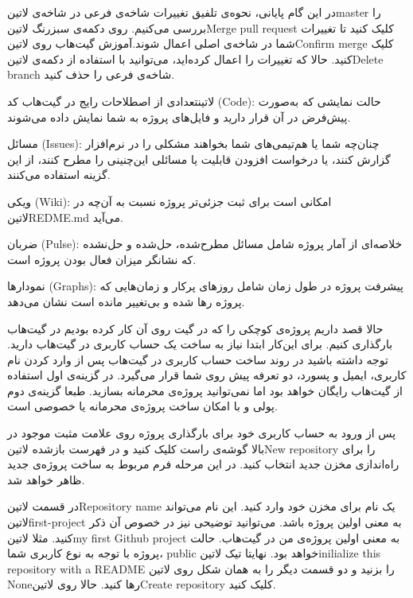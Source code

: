 در این گام پایانی، نحوه‌ی تلفیق تغییرات شاخه‌ی فرعی در شاخه‌ی ‌لاتین{master} را بررسی می‌کنیم.
روی دکمه‌ی سبزرنگ ‌لاتین{Merge pull request} کلیک کنید تا تغییرات شما در شاخه‌ی اصلی اعمال شوند.آموزش گیت‌هاب
روی ‌لاتین{Confirm merge} کلیک کنید.
حالا که تغییرات را اعمال کرده‌اید، می‌توانید با استفاده از دکمه‌ی ‌لاتین{Delete branch} شاخه‌ی فرعی را حذف کنید.


‌لاتین{تعدادی از اصطلاحات رایج در گیت‌هاب}
کد (Code): حالت نمایشی که به‌صورت پیش‌فرض در آن قرار دارید و فایل‌های پروژه به شما نمایش داده می‌شوند.

\noindent
مسائل (Issues): چنان‌چه شما یا هم‌تیمی‌های شما بخواهند مشکلی را در نرم‌افزار گزارش کنند، یا درخواست افزودن قابلیت یا مسائلی این‌چنینی را مطرح کنند، از این گزینه استفاده می‌کنند.

\noindent
ویکی (Wiki): امکانی است برای ثبت جزئی‌تر پروژه نسبت به آن‌چه در ‌لاتین{REDME.md} می‌آید.

\noindent
ضربان (Pulse): خلاصه‌ای از آمار پروژه شامل مسائل مطرح‌شده، حل‌شده و حل‌نشده که نشانگر میزان فعال بودن پروژه است.

\noindent
نمودارها (Graphs): پیشرفت پروژه در طول زمان شامل روزهای پرکار و زمان‌هایی که پروژه رها شده و بی‌تغییر مانده است نشان می‌دهد.

\noindent

حالا قصد داریم پروژه‌ی کوچکی را که در گیت روی آن کار کرده بودیم  در گیت‌هاب بارگذاری کنیم. برای این‌کار ابتدا نیاز به ساخت یک حساب کاربری در گیت‌هاب دارید. توجه داشته باشید در روند ساخت حساب کاربری در گیت‌هاب پس از وارد کردن نام کاربری، ایمیل و پسورد، دو تعرفه پیش روی شما قرار می‌گیرد. در گزینه‌ی اول استفاده از گیت‌هاب رایگان خواهد بود اما نمی‌توانید پروژه‌ی محرمانه بسازید. طبعا گزینه‌ی دوم پولی و با امکان ساخت پروژه‌ی محرمانه یا خصوصی است.

پس از ورود به حساب کاربری خود برای بارگذاری پروژه روی علامت مثبت موجود در بالا گوشه‌ی راست کلیک کنید و در فهرست بازشده ‌لاتین{New repository} را برای راه‌اندازی مخزن جدید انتخاب کنید. در این مرحله فرم مربوط به ساخت پروژه‌ی جدید ظاهر خواهد شد.

در قسمت ‌لاتین{Repository name} یک نام برای مخزن خود وارد کنید. این نام می‌تواند ‌لاتین{first-project} به معنی اولین پروژه باشد. می‌توانید توضیحی نیز در خصوص آن ذکر کنید. مثلا ‌لاتین{my first Github project} به معنی اولین پروژه‌ی من در گیت‌هاب. حالت پروژه با توجه به نوع کاربری شما، public خواهد بود. نهایتا تیک ‌لاتین{inilialize this repository with a README} را بزنید و دو قسمت دیگر را به همان شکل روی ‌لاتین{} Noneرها کنید. حالا روی ‌لاتین{Create repository} کلیک کنید.

